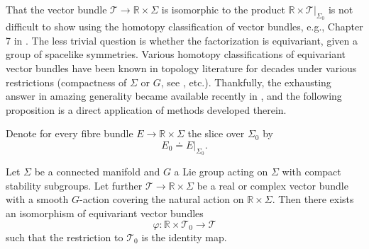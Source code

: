 \documentclass{article}
\begin{document}
That the vector bundle $\mathcal{T}\to\mathbb{R}\times\Sigma$ is isomorphic to the product $\mathbb{R}\times\mathcal{T}|_{\Sigma_0}$ is not difficult to show using the homotopy classification of vector bundles, e.g., Chapter 7 in \cite{Karoubi1978}. The less trivial question is whether the factorization is equivariant, given a group of spacelike symmetries. Various homotopy classifications of equivariant vector bundles have been known in topology literature for decades under various restrictions (compactness of $\Sigma$ or $G$, see \cite{Bierstone1973},\cite{Lashof1982} etc.). Thankfully, the exhausting answer in amazing generality became available recently in \cite{LueckUribe2014}, and the following proposition is a direct application of methods developed therein.

Denote for every fibre bundle $E\to\mathbb{R}\times\Sigma$ the slice over $\Sigma_0$ by
$$
E_0\doteq E|_{\Sigma_0}.
$$
\begin{proposition} Let $\Sigma$ be a connected manifold and $G$ a Lie group acting on $\Sigma$ with compact stability subgroups. Let further $\mathcal{T}\to\mathbb{R}\times\Sigma$ be a real or complex vector bundle with a smooth $G$-action covering the natural action on $\mathbb{R}\times\Sigma$. Then there exists an isomorphism of equivariant vector bundles
$$
\varphi:\mathbb{R}\times\mathcal{T}_0\to\mathcal{T}
$$
such that the restriction to $\mathcal{T}_0$ is the identity map.
\end{proposition}
\end{document}
